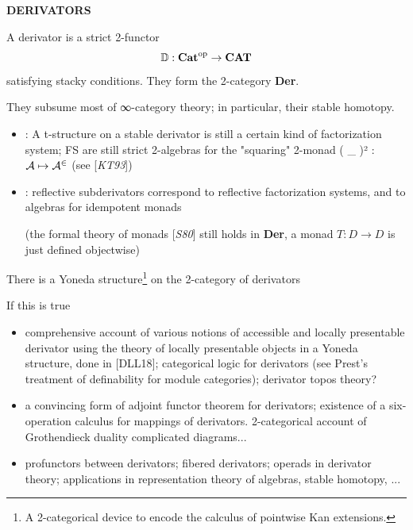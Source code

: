 \documentclass{beamer}
\def\lnk#1{\href{#1}{\faFilePdfO}}
\begin{document}
%
%
%
%
%
%
%
\begin{frame}
  \Huge\centering \bfseries DERIVATORS
\end{frame}
%
\begin{frame}
  A \alert{derivator} is a strict 2-functor
  \[\mathbb{D} : {\bf Cat}^\text{op} \to {\bf CAT} \]
  satisfying stacky conditions. They form the 2-category \textbf{Der}.

  They subsume most of ∞-category theory; in particular, their stable homotopy.
  \begin{itemize}
    \item<2-> [{[\alert{LV17}\lnk{https://www.sciencedirect.com/science/article/abs/pii/S0021869320300296}]}] : A t-structure on a stable derivator is still a certain kind of factorization system; FS are still \alert{strict 2-algebras} for the "squaring" 2-monad ( \_ )² : $\cal A \mapsto \cal A^2$ (see [\emph{KT93}])

    \item<3->  [{[\alert{Lor18}\lnk{https://arxiv.org/abs/1802.08193}]}] : reflective subderivators correspond to reflective factorization systems, and to algebras for idempotent monads

    (the \alert{formal theory of monads} [\emph{S80}] still holds in \textbf{Der}, a monad $T : D \to D$ is just defined objectwise)
  \end{itemize}
\end{frame}
%
\begin{frame}
  There is a \alert{Yoneda structure}\footnote{A 2-categorical device to encode the calculus of pointwise Kan extensions.} on the 2-category of derivators

  If this is true
\begin{itemize}
\item<2-> comprehensive account of various notions of \alert{accessible} and \alert{locally presentable} derivator using the theory of locally presentable objects in a Yoneda structure, done in [\alert{DLL18}]; categorical logic for derivators (see Prest's treatment of \alert{definability} for module categories); derivator topos theory?
\item<3-> a convincing form of \alert{adjoint functor theorem} for derivators; existence of a six-operation calculus for mappings of derivators. 2-categorical account of Grothendieck duality complicated diagrams...
\item<4-> \alert{profunctors} between derivators; fibered derivators; \alert{operads} in derivator theory; applications in representation theory of algebras, stable homotopy, ...
\end{itemize}
\end{frame}
\end{document}
